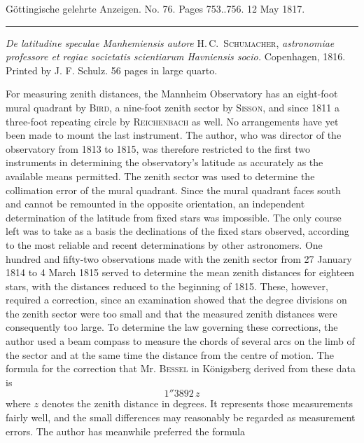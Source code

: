 \clearpage
{}
\hypertarget{native-602-lower}{}
\begin{center}\small Göttingische gelehrte Anzeigen. No. 76. Pages 753..756. 12 May 1817.\\[3pt]\rule{.72\linewidth}{.3pt}\end{center}

\emph{De latitudine speculae Manhemiensis autore} H.\,C.\ \textsc{Schumacher},
\emph{astronomiae professore et regiae societatis scientiarum Havniensis
socio.} Copenhagen, 1816. Printed by J. F. Schulz. 56 pages in large quarto.

\begingroup{}\relax
For measuring zenith distances, the Mannheim Observatory has an eight-foot mural quadrant by \textsc{Bird}, a nine-foot zenith sector by \textsc{Sisson}, and since 1811 a three-foot repeating circle by \textsc{Reichenbach} as well. No arrangements have yet been made to mount the last instrument. The author, who was director of the observatory from 1813 to 1815, was therefore restricted to the first two instruments in determining the observatory’s latitude as accurately as the available means permitted. The zenith sector was used to determine the collimation error of the mural quadrant. Since the mural quadrant faces south and cannot be remounted in the opposite orientation, an independent determination of the latitude from fixed stars was impossible. The only course left was to take as a basis the declinations of the fixed stars observed, according to the most reliable and recent determinations by other astronomers. One hundred and fifty-two observations made with the zenith sector from 27 January 1814 to 4 March 1815 served to determine the mean zenith distances for eighteen stars, with the distances reduced to the beginning of 1815. These, however, required a correction, since an examination showed that the degree divisions on the zenith sector were too small and that the measured zenith distances were consequently too large.
To determine the law governing these corrections, the author used a beam compass to measure the chords of several arcs on the limb of the sector and at the same time the distance from the centre of motion.
The formula for the correction that Mr. \textsc{Bessel} in Königsberg derived from these data is
\[
1''3892\,z
\]
where $z$ denotes the zenith distance in degrees. It represents those measurements fairly well, and the small differences may reasonably be regarded as measurement errors.
The author has meanwhile preferred the formula
